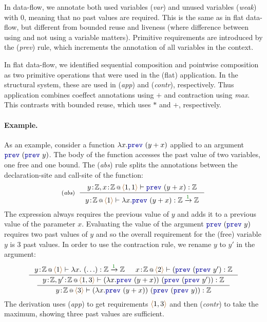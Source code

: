 In data-flow, we annotate both used variables (\emph{var}) and unused variables (\emph{weak}) with
$0$, meaning that no past values are required. This is the same as in flat data-flow, but different
from bounded reuse and liveness (where difference between using and not using a variable matters).
Primitive requirements are introduced by the (\emph{prev}) rule, which increments the annotation of
all variables in the context.

In flat data-flow, we identified sequential composition and pointwise composition as two primitive
operations that were used in the (flat) application. In the structural system, these are used in 
(\emph{app}) and (\emph{contr}), respectively. Thus application combines coeffect annotations using
$+$ and contraction using \emph{max}. This contrasts with bounded reuse, which uses $\ast$ and $+$,
respectively.

\paragraph{Example.} As an example, consider a function $\lambda x.\kvd{prev}~(y+x)$ applied to an argument
$\kvd{prev}~(\kvd{prev}~y)$. The body of the function accesses the past value of two variables, one free
and one bound. The (\emph{abs}) rule splits the annotations between the declaration-site and call-site
of the function:
%
\begin{equation*}
\tyrule{abs}
  {\coctx{y\!:\!\mathbb{Z}, x\!:\!\mathbb{Z}}{\alift{1, 1}} \vdash \kvd{prev}~(y+x) : \mathbb{Z} }
  {\coctx{y\!:\!\mathbb{Z}}{\alift{1}} \vdash \lambda x . \kvd{prev}~(y+x) : \mathbb{Z} \xrightarrow{\cclrd{1}} \mathbb{Z} }
\end{equation*}
%
The expression always requires the previous value of $y$ and adds it to a previous value of the 
parameter $x$. Evaluating the value of the argument $\kvd{prev}~(\kvd{prev}~y)$ requires two past 
values of $y$ and so the overall requirement for the (free) variable $y$ is $3$ past values. In 
order to use the contraction rule, we rename $y$ to $y'$ in the argument:
%
\begin{equation*}
\inference
  { \coctx{y\!:\!\mathbb{Z}}{\alift{1} } \vdash \lambda x.~(\ldots) : \mathbb{Z} \xrightarrow{\cclrd{1}} \mathbb{Z} &
    \coctx{x\!:\!\mathbb{Z}}{\alift{2}} \vdash (\kvd{prev}~(\kvd{prev}~y') : \mathbb{Z} }
{\inference
  { \coctx{y\!:\!\mathbb{Z}, y'\!:\!\mathbb{Z}}{\alift{1,3}} \vdash (\lambda x.\kvd{prev}~(y+x))~(\kvd{prev}~(\kvd{prev}~y')) : \mathbb{Z} }
  { \coctx{y\!:\!\mathbb{Z}}{\alift{3}} \vdash (\lambda x.\kvd{prev}~(y+x))~(\kvd{prev}~(\kvd{prev}~y)) : \mathbb{Z} } }
\end{equation*}
%
The derivation uses (\emph{app}) to get requirements $\alift{1,3}$ and then (\emph{contr}) to take 
the maximum, showing three past values are sufficient. 

